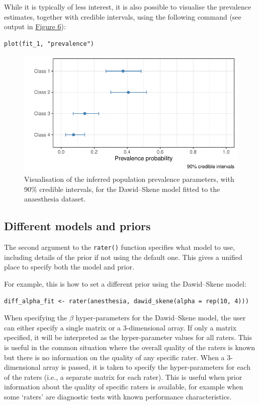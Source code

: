 While it is typically of less interest, it is also possible to visualise the
prevalence estimates, together with credible intervals, using the following
command (see output in \protect\hyperlink{fig:plot-pi}{Figure 6}):

\begin{verbatim}
plot(fit_1, "prevalence")
\end{verbatim}

\begin{figure}

{\centering \includegraphics{RJ-2023-064_files/figure-latex/plot-pi-1} 

}

\caption{Visualisation of the inferred population prevalence parameters, with 90\% credible intervals, for the Dawid--Skene model fitted to the anaesthesia dataset.}\label{fig:plot-pi}
\end{figure}

\hypertarget{sec:different-models-priors}{%
\subsection{Different models and priors}\label{sec:different-models-priors}}

The second argument to the \texttt{rater()} function specifies what model to use,
including details of the prior if not using the default one. This gives a
unified place to specify both the model and prior.

For example, this is how to set a different prior using the Dawid--Skene model:

\begin{verbatim}
diff_alpha_fit <- rater(anesthesia, dawid_skene(alpha = rep(10, 4)))
\end{verbatim}

When specifying the \(\beta\) hyper-parameters for the Dawid--Skene model, the
user can either specify a single matrix or a 3-dimensional array. If only a matrix
specified, it will be interpreted as the hyper-parameter values for all raters.
This is useful in the common situation where the overall quality of the raters
is known but there is no information on the quality of any specific rater.
When a 3-dimensional array is passed, it is taken to specify the hyper-parameters
for each of the raters (i.e., a separate matrix for each rater). This is
useful when prior information about the quality of specific raters is
available, for example when some `raters' are diagnostic tests with known
performance characteristics.

